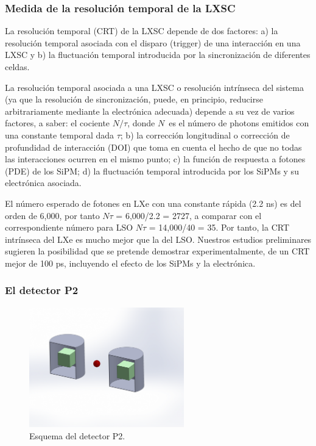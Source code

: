 \subsubsection*{Medida de la resolución temporal de la LXSC}

La resolución temporal (CRT) de la LXSC depende de dos factores: a) la resolución temporal asociada con el disparo (trigger) de una interacción en una LXSC y b) la fluctuación temporal introducida por la sincronización de diferentes celdas.

La resolución temporal asociada a una LXSC o resolución intrínseca del sistema (ya que la resolución de sincronización, puede, en principio, reducirse arbitrariamente mediante la electrónica adecuada) depende a su vez de varios factores, a saber: el cociente $N/\tau$, donde $N$~es el número de photons emitidos con una constante temporal dada $\tau$; b) la corrección longitudinal o corrección de profundidad de interacción (DOI) que toma en cuenta el hecho de que no todas las interacciones ocurren en el mismo punto; c) la función de respuesta a fotones (PDE) de los SiPM; d) la fluctuación temporal introducida por los SiPMs y su electrónica asociada. 

El número esperado de fotones en LXe con una constante rápida (2.2 ns) es del orden de 6,000, por tanto  $N\tau$ = 6,000/2.2 = 2727, a comparar con el correspondiente número para LSO $N\tau$ = 14,000/40 = 35. Por tanto, la CRT intrínseca del LXe es mucho mejor que la del LSO.  Nuestros estudios preliminares sugieren la posibilidad que se pretende demostrar experimentalmente, de un CRT  mejor de 100 ps, incluyendo el efecto de los SiPMs y la electrónica. 

\subsubsection*{El detector P2}

\begin{figure}
\centering
\includegraphics[width=0.6\textwidth]{img/P2.png}
\caption{\small Esquema del detector P2.} \label{fig.P2}
\end{figure} 

